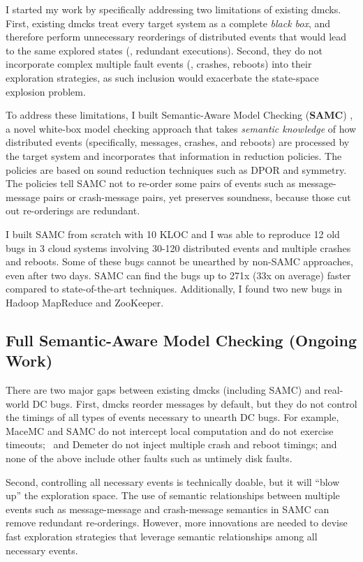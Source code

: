 \documentclass[11pt]{article}
\begin{document}
I started my work by specifically addressing two limitations of existing dmcks.
First, existing dmcks treat every target system as a complete \textit{black
box}, and therefore perform unnecessary reorderings of distributed events that
would lead to the same explored states (\ie, redundant executions). Second,
they do not incorporate complex multiple fault events (\eg, crashes, reboots)
into their exploration strategies, as such inclusion would exacerbate the
state-space explosion problem.

To address these limitations, I built Semantic-Aware Model Checking
(\textbf{SAMC}) \cite{Leesatapornwongsa+15-SamcIssta,Leesatapornwongsa+14-Samc},
a novel white-box model checking approach that takes \textit{semantic knowledge}
of how distributed events (specifically, messages, crashes, and reboots) are
processed by the target system and incorporates that information in reduction
policies.  The policies are based on sound reduction techniques such as DPOR and
symmetry.  The policies tell SAMC not to re-order some pairs of events such as
message-message pairs or crash-message pairs, yet preserves soundness, because
those cut out re-orderings are redundant.

I built SAMC from scratch with 10 KLOC and I was able to reproduce 12 old bugs
in 3 cloud systems involving 30-120 distributed events and multiple crashes and
reboots. Some of these bugs cannot be unearthed by non-SAMC approaches, even
after two days. SAMC can find the bugs up to 271x (33x on average) faster
compared to state-of-the-art techniques. Additionally, I found two new bugs in
Hadoop MapReduce and ZooKeeper.

\subsection{Full Semantic-Aware Model Checking (Ongoing Work)} 

There are two major gaps between existing dmcks (including SAMC) and real-world
DC bugs. First, dmcks reorder messages by default, but they do not control the
timings of all types of events necessary to unearth DC bugs. For example, MaceMC
and SAMC do not intercept local computation and do not exercise timeouts;
\modist\ and Demeter do not inject multiple crash and reboot timings; and none
of the above include other faults such as untimely disk faults.

Second, controlling all necessary events is technically doable, but it will
``blow up'' the exploration space. The use of semantic relationships between
multiple events such as message-message and crash-message semantics in SAMC can
remove redundant re-orderings. However, more innovations are needed to devise
fast exploration strategies that leverage semantic relationships among all
necessary events.
\end{document}
